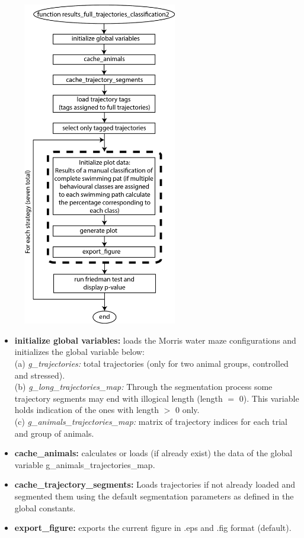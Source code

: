 \documentclass[12pt,titlepage]{article}
\begin{document}
\begin{doublespace}
\begin{figure}[H]
	\begin{center}
		\includegraphics[width=0.6\textwidth]{results_full_trajectories_classification2.jpg}
		\label{sfig4}
	\end{center}
\end{figure}

\begin{itemize}
	\item\textbf{initialize global variables:} loads the Morris water maze configurations and initializes the global variable below:\\
	(a) \textit{g\_trajectories:} total trajectories (only for two animal groups, controlled and stressed).\\
	(b) \textit{g\_long\_trajectories\_map:} Through the segmentation process some trajectory segments may end with illogical length (length $=$ 0). This variable holds  indication of the ones with length $>$ 0 only.\\
	(c) \textit{g\_animals\_trajectories\_map:} matrix of trajectory indices for each trial and group of animals.
	\item\textbf{cache\_animals:} calculates or loads (if already exist) the data of the global variable g\_animals\_trajectories\_map.
	\item\textbf{cache\_trajectory\_segments:} Loads trajectories if not already loaded and segmented them using the default segmentation parameters as defined in the global constants.
	\item\textbf{export\_figure:} exports the current figure in .eps and .fig format (default).
\end{itemize}


\end{doublespace}
\end{document}
